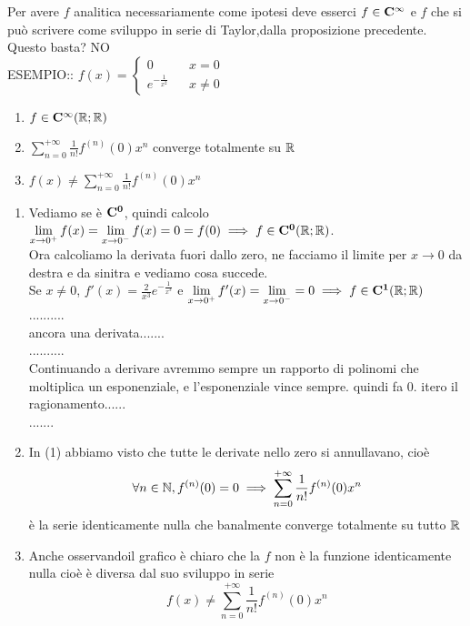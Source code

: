 Per avere $f$ analitica  necessariamente come ipotesi deve esserci $f\in \cntclass{\infty}$ e $f$ che si può scrivere come sviluppo in serie di Taylor,dalla proposizione precedente. Questo basta? NO\\
ESEMPIO:: $f(x)=\left\{\begin{matrix}0&& x=0\\e^{-\frac{1}{x^2}}&&x\ne 0\end{matrix}\right.$
\begin{center}
	\begin{tikzpicture}[scale=1]
	\end{tikzpicture}
\end{center}
\begin{enumerate}
	\item $f\in \cntclass{\infty}( \R; \R)$
	\item $\sum\limits_{n=0}^{+\infty}\frac{1}{n!}f^{(n)}(0)x^n$ converge totalmente su $ \R$
	\item $f(x)\ne\sum\limits_{n=0}^{+\infty}\frac{1}{n!}f^{(n)}(0)x^n$
\end{enumerate}
\begin{enumerate}
	\item Vediamo se è $\cntclass{0}$, quindi calcolo $\lim\limits_{x\to 0^{+}}f(x)=\lim\limits_{x\to 0^{-}}f(x)=0=f(0)\implies f\in \cntclass{0}( \R; \R)$.\\
	Ora calcoliamo la derivata fuori dallo zero, ne facciamo il limite per $x\to 0$ da destra e da sinitra e vediamo cosa succede.\\
	Se $x\ne 0$, $f'(x)=\frac{2}{x^3}e^{-\frac{1}{x^3}}$ e $\lim\limits_{x\to 0^{+}}f'(x)=\lim\limits_{x\to 0^{-}} = 0 \implies f\in \cntclass{1}( \R; \R)$\\
	..........\\
	ancora una derivata.......\\
	..........\\
	Continuando a derivare  avremmo sempre un rapporto di polinomi che moltiplica un esponenziale, e l'esponenziale vince sempre. quindi fa $0$.
	itero il ragionamento......\\
	.......\\
	\item In (1) abbiamo visto  che tutte le derivate nello zero si annullavano, cioè
	\[\forall n\in\N, f^{(n)}(0)=0 \implies \sum\limits_{n=0}^{+\infty}\frac{1}{n!}f^{(n)}(0)x^n\]
	è la serie identicamente nulla  che banalmente converge totalmente su tutto $ \R$
	\item Anche osservandoil grafico è chiaro che la $f$ non è la funzione identicamente nulla cioè è diversa dal suo sviluppo in serie
	\[f(x)\ne\sum\limits_{n=0}^{+\infty}\frac{1}{n!}f^{(n)}(0)x^n\]
\end{enumerate}

